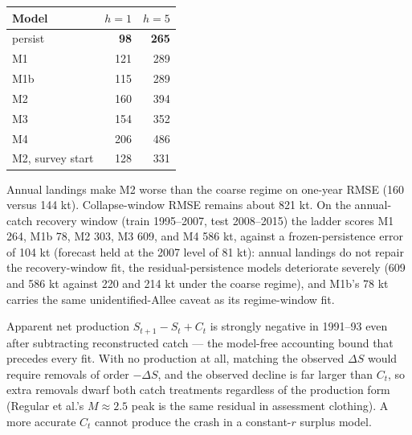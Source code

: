 \documentclass[11pt]{article}
\begin{document}
\begin{longtable}[]{@{}lrr@{}}
\toprule\noalign{}
Model & \(h=1\) & \(h=5\) \\
\midrule\noalign{}
\endhead
\bottomrule\noalign{}
\endlastfoot
persist & \textbf{98} & \textbf{265} \\
M1 & 121 & 289 \\
M1b & 115 & 289 \\
M2 & 160 & 394 \\
M3 & 154 & 352 \\
M4 & 206 & 486 \\
M2, survey start & 128 & 331 \\
\end{longtable}

Annual landings make M2 worse than the coarse regime on one-year RMSE
(160 versus 144 kt). Collapse-window RMSE remains about 821 kt. On the
annual-catch recovery window (train 1995--2007, test 2008--2015) the
ladder scores M1 264, M1b 78, M2 303, M3 609, and M4 586 kt, against a
frozen-persistence error of 104 kt (forecast held at the 2007 level of
81 kt): annual landings do not repair the recovery-window fit, the
residual-persistence models deteriorate severely (609 and 586 kt against
220 and 214 kt under the coarse regime), and M1b's 78 kt carries the
same unidentified-Allee caveat as its regime-window fit.

Apparent net production \(S_{t+1}-S_t+C_t\) is strongly negative in
1991--93 even after subtracting reconstructed catch --- the model-free
accounting bound that precedes every fit. With no production at all,
matching the observed \(\Delta S\) would require removals of order
\(-\Delta S\), and the observed decline is far larger than \(C_t\), so
extra removals dwarf both catch treatments regardless of the production
form (Regular et al.'s \(M \approx 2.5\) peak is the same residual in
assessment clothing). A more accurate \(C_t\) cannot produce the crash
in a constant-\(r\) surplus model.
\end{document}
